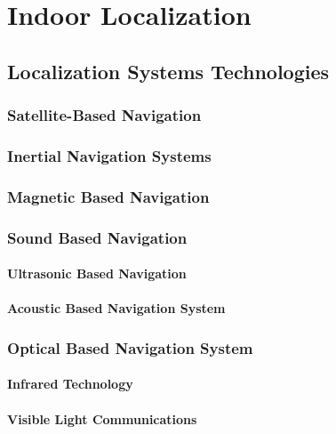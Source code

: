 \chapter{Indoor Localization}

\section{Localization Systems Technologies}

\subsection{Satellite-Based Navigation}

\subsection{Inertial Navigation Systems}

\subsection{Magnetic Based Navigation}

\subsection{Sound Based Navigation}

\subsubsection{Ultrasonic Based Navigation}

\subsubsection{Acoustic Based Navigation System}

\subsection{Optical Based Navigation System}

\subsubsection{Infrared Technology}

\subsubsection{Visible Light Communications}


